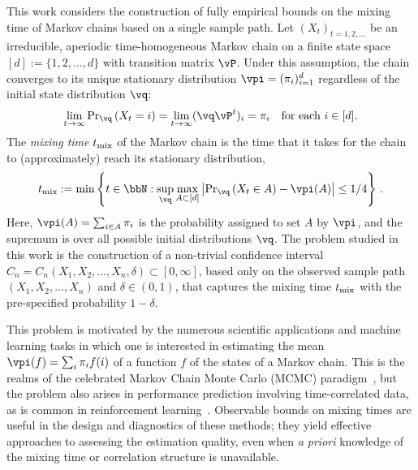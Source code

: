 

This work considers the construction of fully empirical bounds on the
mixing time of Markov chains based on a single sample path.
Let $(X_t)_{t=1,2,\dotsc}$ be an irreducible, aperiodic
time-homogeneous Markov chain on a finite state space $[d] :=
\{1,2,\dotsc,d\}$ with transition matrix $\vP$.
Under this assumption, the chain converges to its unique stationary
distribution $\vpi =
(\pi_i)_{i=1}^d$ regardless of the initial state distribution $\vq$: 
\[
  \lim_{t\to\infty} {\Pr}_{\vq}\Parens{X_t = i}
  = \lim_{t\to\infty} (\vq \vP^t)_i = \pi_i
  \quad \text{for each $i \in [d]$} .
\]
The \emph{mixing time} $t_{\operatorname{mix}}$ of the Markov chain is the time that it
takes for the chain to (approximately) reach its stationary
distribution,
\begin{align}
\label{eq:mixtimedef}
  \tmix
  :=
  \min\Braces{
    t \in \bbN :
    \sup_{\vq}
    \max_{A\subset [d]}
    \Abs{
      \textstyle\Pr_{\vq}\Parens{ X_t \in A } - \vpi(A)
    }
    \leq 1/4
  }\,.
\end{align}
Here, $\vpi(A) = \sum_{i\in A} \pi_i$ is the probability assigned to
set $A$ by $\vpi$, and the supremum is over all possible initial
distributions $\vq$.
The problem studied in this work is the construction of a non-trivial
confidence interval $C_n = C_n(X_1,X_2,\dotsc,X_n,\delta) \subset
[0,\infty]$, based only on the observed sample path
$(X_1,X_2,\dotsc,X_n)$ and $\delta \in (0,1)$, that captures the
mixing time $t_{\operatorname{mix}}$ with the pre-specified probability $1-\delta$. 

This problem is motivated by the numerous scientific applications and
machine learning tasks in which one is interested in estimating the
mean $\vpi(f) = \sum_i \pi_i f(i)$ of a function $f$ of the states of
a Markov chain.
This is the realms of the celebrated Markov Chain Monte Carlo (MCMC)
paradigm~\cite{liu2001monte}, but the problem also arises in
performance prediction involving time-correlated data, as is common in
reinforcement learning~\cite{sutton98}.
Observable bounds on mixing times are useful in the design and
diagnostics of these methods; they yield effective approaches to
assessing the estimation quality, even when \emph{a priori} knowledge
of the mixing time or correlation structure is unavailable.


